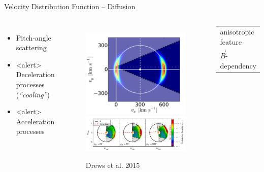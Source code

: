 \documentclass{beamer}
\newcommand{\tabitem}{%
  \usebeamertemplate{itemize item}\hspace*{\labelsep}}
\begin{document}
\begin{frame}{Velocity Distribution Function -- Diffusion} %
\begin{columns}
	\column{5cm}
		\begin{itemize}
			\item Pitch-angle scattering 
			\vspace{1cm}
			\item<alert> Deceleration processes (\textit{``cooling''})
			\vspace{1cm}
			\item<alert> Acceleration processes
		\end{itemize}
	\column{7.5cm}
		\begin{figure}
			\includegraphics[scale=0.15]{pictures/fov.png} \\
			\includegraphics[scale=0.2]{pictures/rvdf}
			\caption{\scriptsize{Drews et al. 2015}}
		\end{figure}
\begin{center}
		\begin{tabular}{@{}l@{}}
			\tabitem anisotropic feature \\
			\tabitem $\vec{B}$-dependency
		\end{tabular}
\end{center}
\end{columns}
\end{frame}
\end{document}
